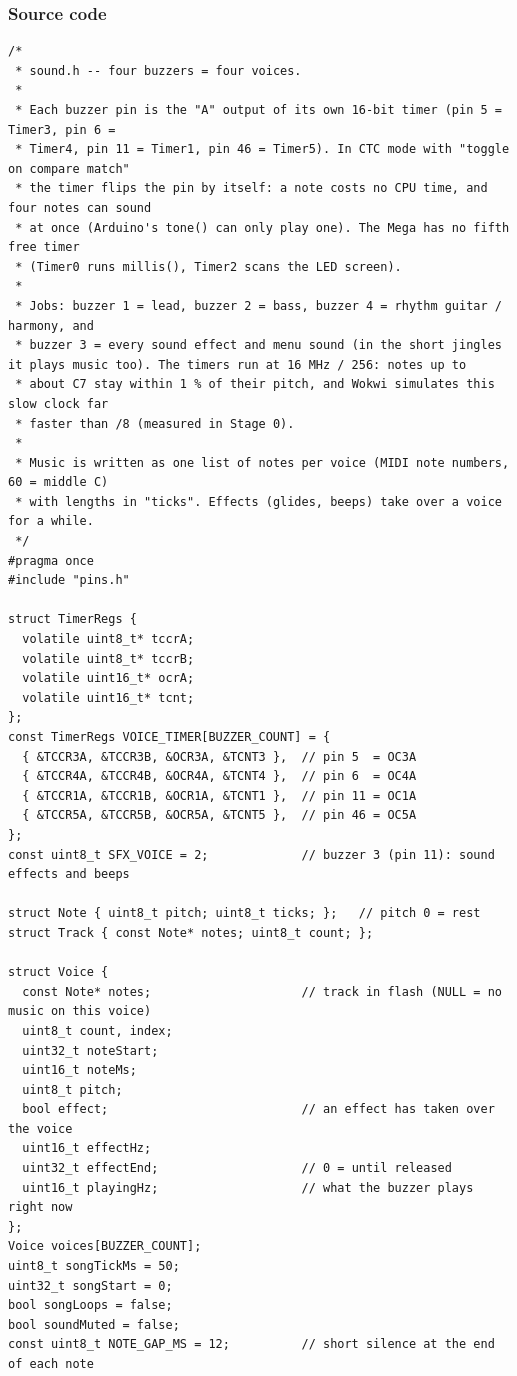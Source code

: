 \documentclass[11pt,a4paper]{article}
\begin{document}
\subsubsection*{Source code}
\begin{lstlisting}[language=Arduino]
/*
 * sound.h -- four buzzers = four voices.
 *
 * Each buzzer pin is the "A" output of its own 16-bit timer (pin 5 = Timer3, pin 6 =
 * Timer4, pin 11 = Timer1, pin 46 = Timer5). In CTC mode with "toggle on compare match"
 * the timer flips the pin by itself: a note costs no CPU time, and four notes can sound
 * at once (Arduino's tone() can only play one). The Mega has no fifth free timer
 * (Timer0 runs millis(), Timer2 scans the LED screen).
 *
 * Jobs: buzzer 1 = lead, buzzer 2 = bass, buzzer 4 = rhythm guitar / harmony, and
 * buzzer 3 = every sound effect and menu sound (in the short jingles it plays music too). The timers run at 16 MHz / 256: notes up to
 * about C7 stay within 1 % of their pitch, and Wokwi simulates this slow clock far
 * faster than /8 (measured in Stage 0).
 *
 * Music is written as one list of notes per voice (MIDI note numbers, 60 = middle C)
 * with lengths in "ticks". Effects (glides, beeps) take over a voice for a while.
 */
#pragma once
#include "pins.h"

struct TimerRegs {
  volatile uint8_t* tccrA;
  volatile uint8_t* tccrB;
  volatile uint16_t* ocrA;
  volatile uint16_t* tcnt;
};
const TimerRegs VOICE_TIMER[BUZZER_COUNT] = {
  { &TCCR3A, &TCCR3B, &OCR3A, &TCNT3 },  // pin 5  = OC3A
  { &TCCR4A, &TCCR4B, &OCR4A, &TCNT4 },  // pin 6  = OC4A
  { &TCCR1A, &TCCR1B, &OCR1A, &TCNT1 },  // pin 11 = OC1A
  { &TCCR5A, &TCCR5B, &OCR5A, &TCNT5 },  // pin 46 = OC5A
};
const uint8_t SFX_VOICE = 2;             // buzzer 3 (pin 11): sound effects and beeps

struct Note { uint8_t pitch; uint8_t ticks; };   // pitch 0 = rest
struct Track { const Note* notes; uint8_t count; };

struct Voice {
  const Note* notes;                     // track in flash (NULL = no music on this voice)
  uint8_t count, index;
  uint32_t noteStart;
  uint16_t noteMs;
  uint8_t pitch;
  bool effect;                           // an effect has taken over the voice
  uint16_t effectHz;
  uint32_t effectEnd;                    // 0 = until released
  uint16_t playingHz;                    // what the buzzer plays right now
};
Voice voices[BUZZER_COUNT];
uint8_t songTickMs = 50;
uint32_t songStart = 0;
bool songLoops = false;
bool soundMuted = false;
const uint8_t NOTE_GAP_MS = 12;          // short silence at the end of each note


\end{lstlisting}
\end{document}
